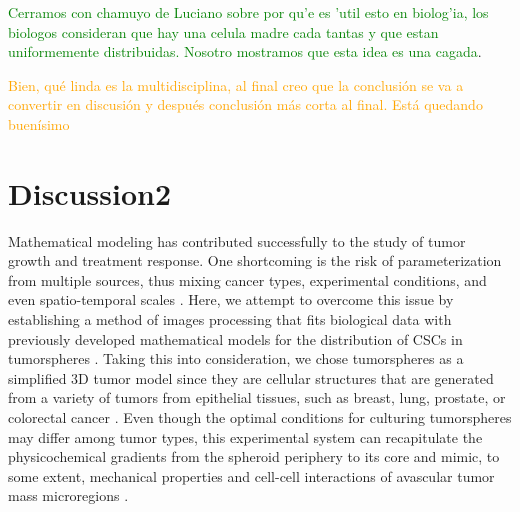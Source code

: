\documentclass[fleqn,10pt]{wlscirep}
\begin{document}
\textcolor{green}{Cerramos con chamuyo de Luciano sobre por qu'e es 'util esto en biolog'ia, los biologos consideran que hay una celula madre cada tantas y que estan uniformemente distribuidas. Nosotro mostramos que esta idea es una cagada}.

\textcolor{orange}{Bien, qué linda es la multidisciplina, al final creo que la conclusión se va a convertir en discusión y después conclusión más corta al final. Está quedando buenísimo} 

\section*{Discussion2}

Mathematical modeling has contributed successfully to the study of tumor growth and treatment response. One shortcoming is the risk of parameterization from multiple sources, thus mixing cancer types, experimental conditions, and even spatio-temporal scales \cite{Brady2019}. Here, we attempt to overcome this issue by establishing a method of images processing that fits biological data with previously developed mathematical models for the distribution of CSCs in tumorspheres \cite{barberis2021percolation}. Taking this into consideration, we chose tumorspheres as a simplified 3D tumor model since they are cellular structures that are generated from a variety of tumors from epithelial tissues, such as breast, lung, prostate, or colorectal cancer \cite{Zanoni2020}. Even though the optimal conditions for culturing tumorspheres may differ among tumor types, this experimental system can recapitulate the physicochemical gradients from the spheroid periphery to its core and mimic, to some extent, mechanical properties and cell-cell interactions of avascular tumor mass microregions \cite{Rolver2019,Zanoni2020}. 
\end{document}
